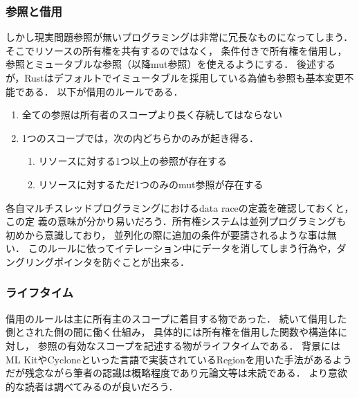 \subsubsection{参照と借用}
しかし現実問題参照が無いプログラミングは非常に冗長なものになってしまう．
そこでリソースの所有権を共有するのではなく，
条件付きで所有権を借用し，参照とミュータブルな参照（以降mut参照）を使えるようにする．
後述するが，Rustはデフォルトでイミュータブルを採用している為値も参照も基本変更不
能である．
以下が借用のルールである．
\begin{enumerate}
  \item 全ての参照は所有者のスコープより長く存続してはならない
  \item 1つのスコープでは，次の内どちらかのみが起き得る．
    \begin{enumerate}
      \item リソースに対する1つ以上の参照が存在する
      \item リソースに対するただ1つのみのmut参照が存在する
    \end{enumerate}
\end{enumerate}
各自マルチスレッドプログラミングにおけるdata raceの定義を確認しておくと，この定
義の意味が分かり易いだろう．所有権システムは並列プログラミングも初めから意識しており，
並列化の際に追加の条件が要請されるような事は無い．
このルールに依ってイテレーション中にデータを消してしまう行為や，ダングリングポインタを防ぐことが出来る．

\subsubsection{ライフタイム}
借用のルールは主に所有主のスコープに着目する物であった．
続いて借用した側とされた側の間に働く仕組み，
具体的には所有権を借用した関数や構造体に対し，
参照の有効なスコープを記述する物がライフタイムである．
背景にはML KitやCycloneといった言語で実装されているRegionを用いた手法があるようだが残念ながら筆者の認識は概略程度であり元論文等は未読である．
より意欲的な読者は調べてみるのが良いだろう．


